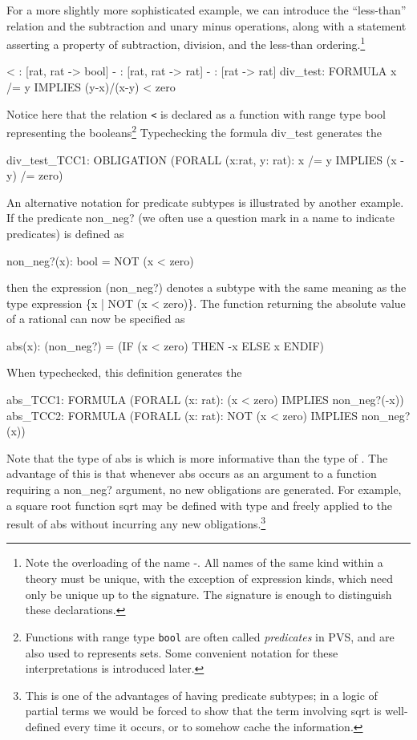 For a more slightly more sophisticated example, we can introduce the
``less-than'' relation and the subtraction and unary minus operations,
along with a statement asserting a property of subtraction, division, and
the less-than ordering.\footnote{Note the overloading of the name {\stt -}.
All names of the same kind within a theory must be unique, with the
exception of expression kinds, which need only be unique up to the
signature. The signature is enough to distinguish these declarations.}
\begin{pvsex}
  < : [rat, rat -> bool]
  - : [rat, rat -> rat]
  - : [rat -> rat]
  div\_test: FORMULA x /= y IMPLIES (y-x)/(x-y) < zero
\end{pvsex}
%
Notice here that the relation {\tt <} is declared as a function with
range type {\stt bool} representing the booleans\footnote{Functions
with range type {\tt bool} are often called {\em predicates\/} in PVS,
and are also used to represents sets.  Some convenient notation for
these interpretations is introduced later.} Typechecking the formula
{\stt div\_test} generates the \tcc\
\begin{pvsex}
  div\_test\_TCC1: OBLIGATION
      (FORALL (x:rat, y: rat): x /= y IMPLIES (x - y) /= zero)
\end{pvsex}
%
An alternative notation for predicate subtypes is illustrated by another
example.  If the predicate {\stt non\_neg?} (we often use a question
mark in a name to indicate predicates) is defined as
\begin{pvsex}
  non\_neg?(x): bool = NOT (x < zero)
\end{pvsex}
%
then the expression {\stt (non\_neg?)} denotes a subtype with the same
meaning as the type expression {\stt \{x | NOT (x < zero)\}}.  The
function returning the absolute value of a rational can now be specified as
\begin{pvsex}
  abs(x): (non\_neg?) = (IF (x < zero) THEN -x ELSE x ENDIF)
\end{pvsex}
%
When typechecked, this definition generates the \tccs
\begin{pvsex}
  abs\_TCC1: FORMULA
    (FORALL (x: rat): (x < zero) IMPLIES non\_neg?(-x))
  abs\_TCC2: FORMULA
    (FORALL (x: rat): NOT (x < zero) IMPLIES non\_neg?(x))
\end{pvsex}
%
Note that the type of {\stt abs} is {} which
is more informative than the type of {\stt [rat -> rat]}.  The advantage
of this is that whenever {\stt abs} occurs as an argument to a function
requiring a {\stt non\_neg?} argument, no new obligations are generated.
For example, a square root function {\stt sqrt} may be defined with type
{\stt [(non\_neg?) -> (non\_neg?)]} and freely applied to the result of
{\stt abs} without incurring any new obligations.\footnote{This is one of
the advantages of having predicate subtypes; in a logic of partial terms
we would be forced to show that the term involving {\stt sqrt} is
well-defined every time it occurs, or to somehow cache the information.}

